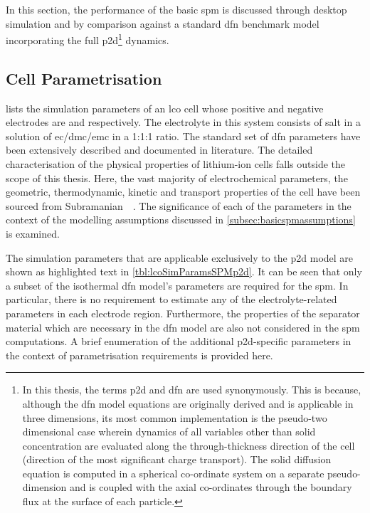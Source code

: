 
In this  section, the performance  of the  basic \gls{spm} is  discussed through
desktop  simulation and  by comparison  against a  standard \gls{dfn}  benchmark
model  incorporating  the  full  \gls{p2d}\footnote{In this  thesis,  the  terms
\gls{p2d} and  \gls{dfn} are  used synonymously. This  is because,  although the
\gls{dfn}  model equations  are originally  derived and  is applicable  in three
dimensions, its  most common implementation  is the pseudo-two  dimensional case
wherein dynamics of  all variables other than solid  concentration are evaluated
along  the  through-thickness direction  of  the  cell  (direction of  the  most
significant charge  transport). The  solid diffusion equation  is computed  in a
spherical co-ordinate system on a  separate pseudo-dimension and is coupled with
the  axial  co-ordinates through  the  boundary  flux  at  the surface  of  each
particle.} dynamics.

\subsection{Cell Parametrisation}\label{subsec:spmp2dparametrisation}


 lists  the simulation  parameters of  an \gls{lco}
cell  whose positive  and negative  electrodes are   and  
respectively.  The  electrolyte in  this  system  consists of    salt
in  a   solution  of   \gls{ec}/\gls{dmc}/\gls{emc}  in   a  1:1:1   ratio.  The
standard  set  of  \gls{dfn}  parameters have  been  extensively  described  and
documented  in  literature.  The   detailed  characterisation  of  the  physical
properties  of  lithium-ion  cells  falls  outside the  scope  of  this  thesis.
Here, the  vast majority  of electrochemical  parameters, \viz{}  the geometric,
thermodynamic, kinetic  and transport properties  of the cell have  been sourced
from  Subramanian~\etal{}~\cite{Subramanian2009}.   The  significance   of  each
of  the  parameters  in  the  context of  the  modelling  assumptions  discussed
in \cref{subsec:basicspmassumptions} is examined.

The simulation parameters that are applicable exclusively to the \gls{p2d} model
are shown as  highlighted text in \cref{tbl:lcoSimParamsSPMp2d}. It  can be seen
that only a  subset of the isothermal \gls{dfn} model's  parameters are required
for the \gls{spm}. In particular, there is no requirement to estimate any of the
electrolyte-related  parameters  in  each  electrode  region.  Furthermore,  the
properties of the separator material which  are necessary in the \gls{dfn} model
are also  not considered in the  \gls{spm} computations. A brief  enumeration of
the additional  \gls{p2d}-specific parameters in the  context of parametrisation
requirements is provided here.

